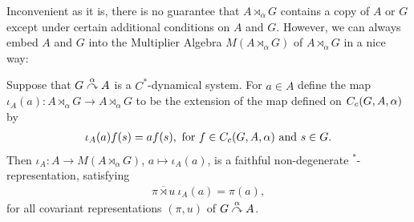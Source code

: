 Inconvenient as it is, there is no guarantee that $A \rtimes_\alpha G$ contains a copy of $A$ or $G$ except under certain additional conditions on $A$ and $G$. However, we can always embed $A$ and $G$ into the Multiplier Algebra $M(A \rtimes_\alpha G)$ of $A \rtimes_\alpha G$ in a nice way:
\begin{lemma}
Suppose that $G \stackrel{\alpha}{\curvearrowright} A$ is a $C^*$-dynamical system. For $a \in A$ define the map $\iota_A(a) \colon A \rtimes_\alpha G \to A \rtimes_\alpha G$ to be the extension of the map defined on $C_c(G,A,\alpha)$ by
\begin{align*}
	\iota_A(a) f(s) = af(s), \text{ for } f \in C_c(G,A,\alpha) \text{ and } s \in G.
\end{align*}
Then $\iota_A \colon A \to M(A \rtimes_\alpha G)$, $a \mapsto \iota_A(a)$, is a faithful non-degenerate $^*$-representation, satisfying
\begin{align*}
	\overline{\pi \rtimes u } \ \iota_A(a) = \pi(a),
\end{align*}
for all covariant representations $(\pi,u)$ of $G \stackrel{\alpha}{\curvearrowright} A $.
\end{lemma}
